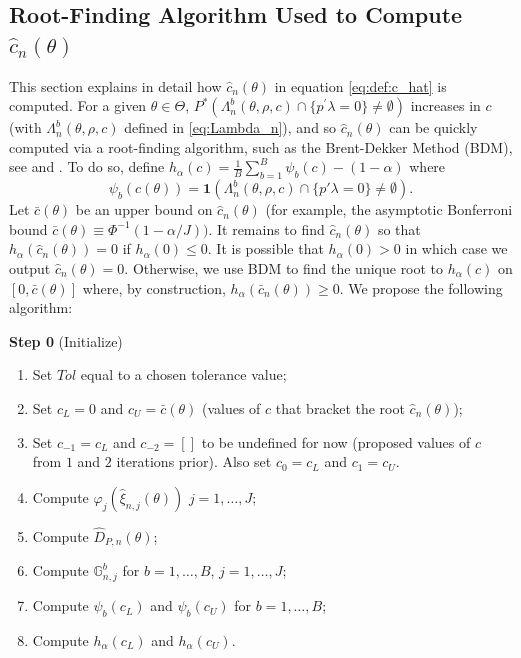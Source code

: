 \documentclass[letterpaper,11pt]{article}
\theoremstyle{myplain}
\theoremstyle{mydefinition}
\theoremstyle{myremark}
\renewcommand{\cite}{\citet}
\newcommand{\G}{\mathbb{G}}
\numberwithin{equation}{section}
\numberwithin{figure}{section}
\begin{document}
\begin{appendices}
\subsection{Root-Finding Algorithm Used to Compute $\hat{c}_n(\theta)$}\label{sec:bisection}
This section explains in detail how $\hat{c}_n(\theta)$ in equation \eqref{eq:def:c_hat} is computed.
For a given $\theta \in \Theta$, $P^*(\Lambda_n^b (\theta ,\rho ,c)\cap \{p^{\prime }\lambda =0\}\neq \emptyset)$ increases in $c$ (with $\Lambda_n^b (\theta ,\rho ,c)$ defined in \eqref{eq:Lambda_n}), and so $\hat c_n(\theta)$ can be quickly computed via a root-finding algorithm, such as the Brent-Dekker Method (BDM), see \cite{brent1971algorithm} and \cite{dekker1969finding}.  To do so, define $h_{\alpha}(c) = \frac{1}{B} \sum_{b=1}^B \psi_b(c) - (1-\alpha)$ where
\[
\psi_b(c(\theta)) = \mathbf{1}(\Lambda_n^b(\theta,\rho,c) \cap \{p'\lambda = 0\}\neq \emptyset).
\]
Let $\bar c(\theta)$ be an upper bound on $\hat c_n(\theta)$ (for example, the asymptotic Bonferroni bound $\bar c(\theta) \equiv \Phi^{-1}(1-\alpha/J))$.  It remains to find $\hat c_n(\theta)$ so that $h_{\alpha}(\hat c_n(\theta)) =  0$ if $h_{\alpha}(0)\leq 0$.  It is possible that $h_{\alpha}(0) > 0$ in which case we output $\hat c_n(\theta) = 0$.  Otherwise, we use BDM to find the unique root to $h_{\alpha}(c)$ on $[0,\bar c(\theta)]$ where, by construction, $h_{\alpha}(\bar c_n(\theta)) \geq 0$.  We propose the following algorithm:

\textbf{Step 0} (Initialize)
\begin{enumerate}[label=(\roman*)]

\item Set $\mathit{Tol}$ equal to a chosen tolerance value;
\item Set $c_L = 0$ and $c_U =\bar c(\theta)$ (values of $c$ that bracket the root $\hat c_n(\theta)$);
\item Set $c_{-1} = c_L$ and $c_{-2}=[]$ to be undefined for now (proposed values of $c$ from $1$ and $2$ iterations prior).  Also set $c_0 = c_L$ and $c_1 = c_U$.
\item Compute $\varphi_j( \hat \xi_{n,j}(\theta))$ $j = 1,\dots,J$;
\item Compute $\hat D_{P,n}(\theta)$;
\item Compute $\G^b_{n,j}$ for $b = 1,\dots,B$, $j = 1,\dots,J$;
\item Compute $\psi_b(c_L)$ and $\psi_b(c_U)$ for $b = 1,\dots,B$;
\item Compute $h_{\alpha}(c_L)$ and $h_{\alpha}(c_U)$.
\end{enumerate}



\end{appendices}
\end{document}
